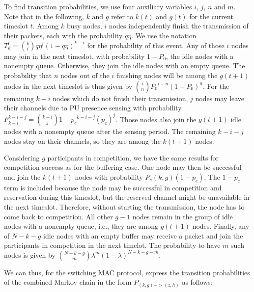 \documentclass[12pt,journal,oneside,onecolumn]{IEEEtran}
\begin{document}
To find transition probabilities, we use four 
auxiliary variables $i$, $j$, $n$ and $m$. Note that in 
the following,  $k$ and $g$ refer to $k(t)$ and $g(t)$ 
for the current timeslot $t$. 
Among $k$ busy nodes, $i$ nodes independently finish the transmission 
of their packets, each with the probability $q \eta$. 
We use the notation $T_{k}^{i}={k \choose i} q\eta^{i} (1-q\eta)^{k-i}$ 
for the probability of this event. Any of those $i$ nodes may  join in the next timeslot, with probability $1-P_0$, the idle nodes with a nonempty 
queue. Otherwise, they join 
the idle nodes with an empty queue. 
The probability that $n$ nodes out of the $i$ finishing nodes will be among the $g(t+1)$ nodes in the next
timeslot is thus given by  ${i \choose n} {P_0}^{i-n} (1-P_0)^{n}$.
For the remaining $k-i$ nodes which do not finish their transmission, $j$ nodes 
may leave their channels due to PU presence sensing with  
probability $F^{k-i-j}_{k-i}={k-i \choose j} {1-p_c}^{k-i-j} (p_c)^{j}$.
Those nodes also join the $g(t+1)$ idle nodes with a nonempty queue after the sensing period.
The remaining $k-i-j$ nodes stay on their channels, 
so they are among the $k(t+1)$ nodes.

Considering $g$ participants in competition, we have the 
same results for competition success as for the buffering case. One node may then be 
successful and join the $k(t+1)$ nodes with probability $P_s(k,g) (1-p_c)$. The 
$1-p_c$ term is included because the node may be successful in 
competition and reservation during this timeslot, but 
the reserved channel might be unavailable in the next timeslot. 
Therefore, without starting the transmission, the node 
has to come back to competition.  All other $g-1$ nodes 
remain in the group of idle nodes with a nonempty queue, 
i.e., they are among $g(t+1)$ nodes. Finally, any of 
$N-k-g$ idle nodes with an empty buffer may receive a 
packet and join the participants in competition in the 
next timelot. The probability to have $m$ such nodes is 
given by ${N-k-g \choose m} {\lambda}^{m} (1-\lambda)^{N-k-g-m}$. 

We can thus, for the switching MAC protocol, express the transition probabilities 
of the combined Markov chain in the form $P_{(k,g)->(z,h)}$ as follows:
\end{document}

